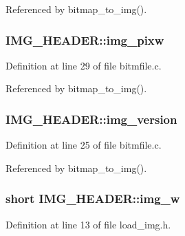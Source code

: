 Referenced by bitmap\+\_\+to\+\_\+img().

\hypertarget{structIMG__HEADER_a7d5c243cda9e3046c3da9421d0cc42c5}{
\subsubsection[{img\+\_\+pixw}]{ I\+M\+G\+\_\+\+H\+E\+A\+D\+E\+R\+::img\+\_\+pixw}}\label{structIMG__HEADER_a7d5c243cda9e3046c3da9421d0cc42c5}


Definition at line 29 of file bitmfile.\+c.



Referenced by bitmap\+\_\+to\+\_\+img().

\hypertarget{structIMG__HEADER_a419b9ebcef3ef87315256318886eb60c}{
\subsubsection[{img\+\_\+version}]{ I\+M\+G\+\_\+\+H\+E\+A\+D\+E\+R\+::img\+\_\+version}}\label{structIMG__HEADER_a419b9ebcef3ef87315256318886eb60c}


Definition at line 25 of file bitmfile.\+c.



Referenced by bitmap\+\_\+to\+\_\+img().

\hypertarget{structIMG__HEADER_acab9fca679b5827910e3c2a6e302e9f2}{
\subsubsection[{img\+\_\+w}]{\setlength{\rightskip}{0pt plus 5cm}short I\+M\+G\+\_\+\+H\+E\+A\+D\+E\+R\+::img\+\_\+w}}\label{structIMG__HEADER_acab9fca679b5827910e3c2a6e302e9f2}


Definition at line 13 of file load\+\_\+img.\+h.



